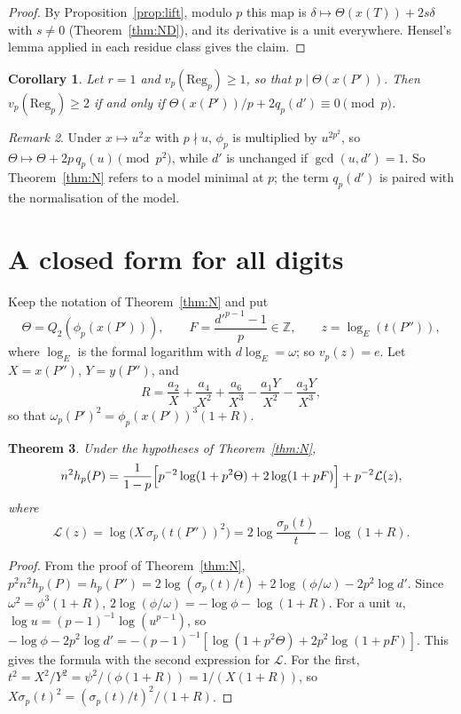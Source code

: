 \documentclass[11pt,a4paper]{amsart}
\newcommand{\Z}{\mathbb{Z}}
\newcommand{\Reg}{\mathrm{Reg}}
\newcommand{\qp}{q_p}
\newcommand{\cL}{\mathcal{L}}
\theoremstyle{plain}
\newtheorem{theorem}{Theorem}[section]
\newtheorem{corollary}[theorem]{Corollary}
\theoremstyle{definition}
\theoremstyle{remark}
\newtheorem{remark}[theorem]{Remark}
\begin{document}
\begin{proof}
By Proposition~\ref{prop:lift}, modulo $p$ this map is $\delta\mapsto\Theta(x(T))+2s\delta$ with $s\ne0$ (Theorem~\ref{thm:ND}), and its derivative is a unit everywhere. Hensel's lemma applied in each residue class gives the claim.
\end{proof}

\begin{corollary}\label{cor:Nprime}
Let $r=1$ and $v_p(\Reg_p)\ge1$, so that $p\mid\Theta(x(P'))$. Then $v_p(\Reg_p)\ge2$ if and only if $\Theta(x(P'))/p+2\qp(d')\equiv0\pmod p$.
\end{corollary}

\begin{remark}
Under $x\mapsto u^2x$ with $p\nmid u$, $\phi_p$ is multiplied by $u^{2p^2}$, so $\Theta\mapsto\Theta+2p\,\qp(u)\pmod{p^2}$, while $d'$ is unchanged if $\gcd(u,d')=1$. So Theorem~\ref{thm:N} refers to a model minimal at $p$; the term $\qp(d')$ is paired with the normalisation of the model.
\end{remark}

\section{A closed form for all digits}\label{sec:closed}

Keep the notation of Theorem~\ref{thm:N} and put
\[
\Theta=Q_2(\phi_p(x(P'))),\qquad F=\frac{d'^{p-1}-1}{p}\in\Z,\qquad z=\log_E(t(P'')),
\]
where $\log_E$ is the formal logarithm with $d\log_E=\omega$; so $v_p(z)=e$. Let $X=x(P'')$, $Y=y(P'')$, and
\[
R=\frac{a_2}X+\frac{a_4}{X^2}+\frac{a_6}{X^3}-\frac{a_1Y}{X^2}-\frac{a_3Y}{X^3},
\]
so that $\omega_p(P')^2=\phi_p(x(P'))^3(1+R)$.

\begin{theorem}\label{thm:Nstar}
Under the hypotheses of Theorem~\ref{thm:N},
\[
n^2h_p(P)=\frac1{1-p}\Bigl[p^{-2}\log(1+p^2\Theta)+2\log(1+pF)\Bigr]+p^{-2}\cL(z),
\]
where
\[
\cL(z)=\log\bigl(X\,\sigma_p(t(P''))^2\bigr)=2\log\frac{\sigma_p(t)}t-\log(1+R).
\]
\end{theorem}

\begin{proof}
From the proof of Theorem~\ref{thm:N}, $p^2n^2h_p(P)=h_p(P'')=2\log(\sigma_p(t)/t)+2\log(\phi/\omega)-2p^2\log d'$. Since $\omega^2=\phi^3(1+R)$, $2\log(\phi/\omega)=-\log\phi-\log(1+R)$. For a unit $u$, $\log u=(p-1)^{-1}\log(u^{p-1})$, so $-\log\phi-2p^2\log d'=-(p-1)^{-1}[\log(1+p^2\Theta)+2p^2\log(1+pF)]$. This gives the formula with the second expression for $\cL$. For the first, $t^2=X^2/Y^2=\psi^2/(\phi(1+R))=1/(X(1+R))$, so $X\sigma_p(t)^2=(\sigma_p(t)/t)^2/(1+R)$.
\end{proof}
\end{document}
